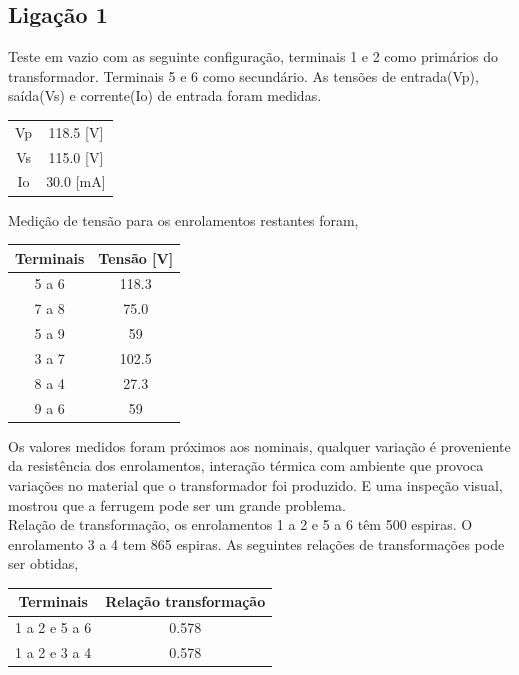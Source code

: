 \documentclass[conference]{IEEEtran}
\begin{document}
\subsection{Ligação 1}

Teste em vazio com as seguinte configuração, terminais 1 e 2 como
primários do transformador. Terminais 5 e 6 como secundário.
As tensões de entrada(Vp), saída(Vs) e corrente(Io) de entrada foram medidas.

\begin{center}
    \begin{tabular}{|c||c|}
        \hline 
        Vp & 118.5 [V]\\
        Vs & 115.0 [V] \\
        Io & 30.0 [mA] \\
        \hline
    \end{tabular}
\end{center}

Medição de tensão para os enrolamentos restantes foram,

\begin{center}
    \begin{tabular}{|c||c|}
        \hline 
        Terminais & Tensão [V] \\
        \hline 
        5 a 6 & 118.3 \\
        7 a 8 & 75.0 \\
        5 a 9 & 59 \\
        3 a 7 & 102.5 \\
        8 a 4 & 27.3 \\
        9 a 6 & 59 \\
        \hline
    \end{tabular}
\end{center}

Os valores medidos foram próximos aos nominais, qualquer variação é 
proveniente da resistência dos enrolamentos, interação térmica com
ambiente que provoca variações no material que o transformador 
foi produzido. E uma inspeção visual, mostrou que a ferrugem pode
ser um grande problema. \\
Relação de transformação, os enrolamentos 1 a 2 e 5 a 6 têm 500 espiras.
O enrolamento 3 a 4 tem 865 espiras. As seguintes relações de transformações
pode ser obtidas,

\begin{center}
    \begin{tabular}{|c||c|}
        \hline 
        Terminais & Relação transformação \\
        \hline 
        1 a 2 e 5 a 6 & 0.578 \\
        1 a 2 e 3 a 4 & 0.578 \\
        \hline
    \end{tabular}
\end{center}
\end{document}
